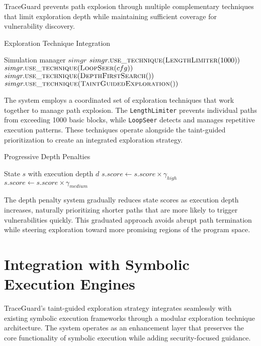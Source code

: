 TraceGuard prevents path explosion through multiple complementary techniques that limit exploration depth while maintaining sufficient coverage for vulnerability discovery.

\begin{algorithm}
\caption{Exploration Technique Integration}
\begin{algorithmic}[1]
\Require Simulation manager $simgr$
\State $simgr.\textsc{use\_technique}(\textsc{LengthLimiter}(1000))$
\State $simgr.\textsc{use\_technique}(\textsc{LoopSeer}(cfg))$
\State $simgr.\textsc{use\_technique}(\textsc{DepthFirstSearch}())$
\State $simgr.\textsc{use\_technique}(\textsc{TaintGuidedExploration}())$
\end{algorithmic}
\end{algorithm}

The system employs a coordinated set of exploration techniques that work together to manage path explosion. The \texttt{LengthLimiter} prevents individual paths from exceeding 1000 basic blocks, while \texttt{LoopSeer} detects and manages repetitive execution patterns. These techniques operate alongside the taint-guided prioritization to create an integrated exploration strategy.

\begin{algorithm}
\caption{Progressive Depth Penalties}
\begin{algorithmic}[1]
\Require State $s$ with execution depth $d$
    \State $s.score \gets s.score \times \gamma_{high}$
    \State $s.score \gets s.score \times \gamma_{medium}$
\EndIf
\end{algorithmic}
\end{algorithm}

The depth penalty system gradually reduces state scores as execution depth increases, naturally prioritizing shorter paths that are more likely to trigger vulnerabilities quickly. This graduated approach avoids abrupt path termination while steering exploration toward more promising regions of the program space.

\section{Integration with Symbolic Execution Engines}

TraceGuard's taint-guided exploration strategy integrates seamlessly with existing symbolic execution frameworks through a modular exploration technique architecture. The system operates as an enhancement layer that preserves the core functionality of symbolic execution while adding security-focused guidance.

